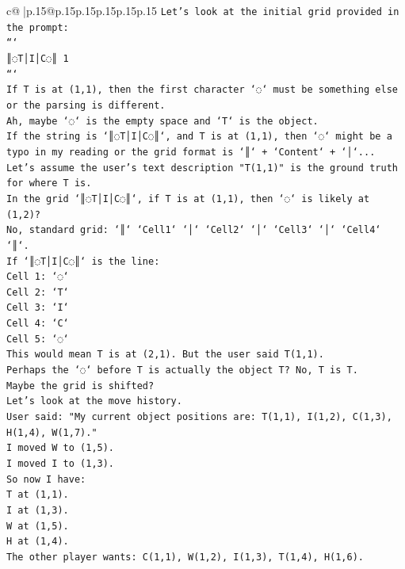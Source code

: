 \documentclass{article}
\begin{document}
{\begin{supertabular}{c@{$\;$}|p{.15\linewidth}@{}p{.15\linewidth}p{.15\linewidth}p{.15\linewidth}p{.15\linewidth}p{.15\linewidth}}
{{{\texttt{Let's look at the initial grid provided in the prompt:} \\
\texttt{```} \\
\texttt{║◌T│I│C◌║ 1} \\
\texttt{```} \\
\texttt{If T is at (1,1), then the first character `◌` must be something else or the parsing is different.} \\
\texttt{Ah, maybe `◌` is the empty space and `T` is the object.} \\
\texttt{If the string is `║◌T│I│C◌║`, and T is at (1,1), then `◌` might be a typo in my reading or the grid format is `║` + `Content` + `│`...} \\
\texttt{Let's assume the user's text description "T(1,1)" is the ground truth for where T is.} \\
\texttt{In the grid `║◌T│I│C◌║`, if T is at (1,1), then `◌` is likely at (1,2)?} \\
\texttt{No, standard grid: `║` `Cell1` `│` `Cell2` `│` `Cell3` `│` `Cell4` `║`.} \\
\texttt{If `║◌T│I│C◌║` is the line:} \\
\texttt{Cell 1: `◌`} \\
\texttt{Cell 2: `T`} \\
\texttt{Cell 3: `I`} \\
\texttt{Cell 4: `C`} \\
\texttt{Cell 5: `◌`} \\
\texttt{This would mean T is at (2,1). But the user said T(1,1).} \\
\texttt{Perhaps the `◌` before T is actually the object T? No, T is T.} \\
\texttt{Maybe the grid is shifted?} \\
\texttt{Let's look at the move history.} \\
\texttt{User said: "My current object positions are: T(1,1), I(1,2), C(1,3), H(1,4), W(1,7)."} \\
\texttt{I moved W to (1,5).} \\
\texttt{I moved I to (1,3).} \\
\texttt{So now I have:} \\
\texttt{T at (1,1).} \\
\texttt{I at (1,3).} \\
\texttt{W at (1,5).} \\
\texttt{H at (1,4).} \\
\texttt{The other player wants: C(1,1), W(1,2), I(1,3), T(1,4), H(1,6).} \\
}}}
\end{supertabular}}
\end{document}

